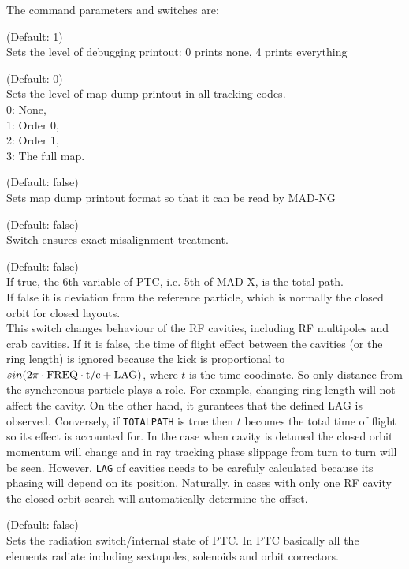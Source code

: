 The command parameters and switches are:
\begin{madlist}
	 (Default: 1)\\
	Sets the level of debugging printout: 0 prints none, 4 prints everything

   (Default: 0)\\
  Sets the level of map dump printout in all tracking codes. \\
  0: None,\\
  1: Order 0,\\
  2: Order 1,\\
  3: The full map.

   (Default: false)\\
  Sets map dump printout format so that it can be read by MAD-NG

	 (Default: false)\\
	Switch ensures exact misalignment treatment.

	 (Default: false)\\
	If true, the 6th variable of PTC, i.e. 5th of MAD-X, is the total path.  \\
	If false it is deviation from the reference particle,
	which is normally the closed orbit for closed layouts. \\
	This switch changes behaviour of the RF cavities,
	including RF multipoles and crab cavities.
	If it is false, the time of flight effect between the cavities
	(or the ring length) is ignored because the kick is proportional to \\
	$sin(2\pi \cdot \rm{FREQ} \cdot t/c + \rm{LAG})$, where $t$ is the time coodinate.
	So only distance from the synchronous particle plays a role.
	For example, changing ring length will not affect the cavity.
	On the other hand, it gurantees that the defined LAG is observed.
	Conversely, if \texttt{TOTALPATH} is true then $t$ becomes the total time of flight
	so its effect is accounted for. In the case when cavity is detuned
	the closed orbit momentum will change and in ray tracking phase slippage from turn
	to turn will be seen. However, \texttt{LAG} of cavities needs to be
	carefuly calculated because its phasing will depend on its position.
	Naturally, in cases with only one RF cavity the closed orbit search will automatically
	determine the offset.

	 (Default: false)\\
	Sets the radiation switch/internal state of PTC. In PTC basically all the elements
	radiate including sextupoles, solenoids and orbit correctors.


\end{madlist}
